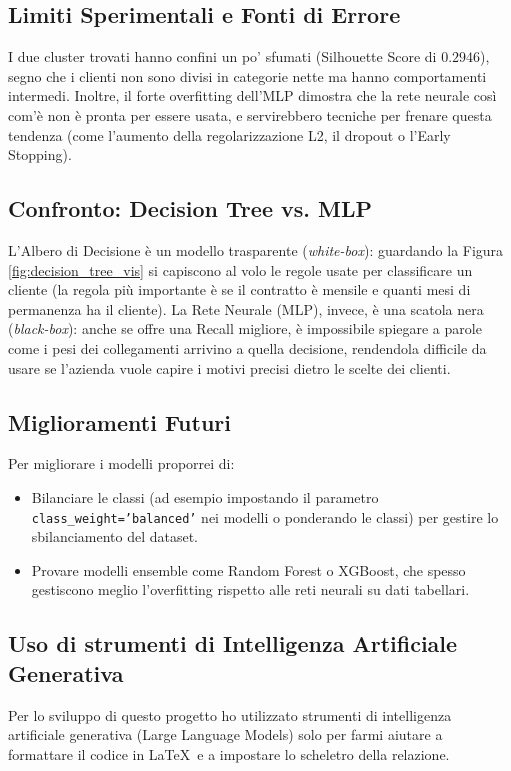 \documentclass[a4paper,11pt]{article}
\begin{document}
\subsection{Limiti Sperimentali e Fonti di Errore}
I due cluster trovati hanno confini un po' sfumati (Silhouette Score di $0.2946$), segno che i clienti non sono divisi in categorie nette ma hanno comportamenti intermedi. Inoltre, il forte overfitting dell'MLP dimostra che la rete neurale così com'è non è pronta per essere usata, e servirebbero tecniche per frenare questa tendenza (come l'aumento della regolarizzazione L2, il dropout o l'Early Stopping).

\subsection{Confronto: Decision Tree vs. MLP}
L'Albero di Decisione è un modello trasparente (\textit{white-box}): guardando la Figura \ref{fig:decision_tree_vis} si capiscono al volo le regole usate per classificare un cliente (la regola più importante è se il contratto è mensile e quanti mesi di permanenza ha il cliente). La Rete Neurale (MLP), invece, è una scatola nera (\textit{black-box}): anche se offre una Recall migliore, è impossibile spiegare a parole come i pesi dei collegamenti arrivino a quella decisione, rendendola difficile da usare se l'azienda vuole capire i motivi precisi dietro le scelte dei clienti.

\subsection{Miglioramenti Futuri}
Per migliorare i modelli proporrei di:
\begin{itemize}
    \item Bilanciare le classi (ad esempio impostando il parametro \texttt{class\_weight='balanced'} nei modelli o ponderando le classi) per gestire lo sbilanciamento del dataset.
    \item Provare modelli ensemble come Random Forest o XGBoost, che spesso gestiscono meglio l'overfitting rispetto alle reti neurali su dati tabellari.
\end{itemize}

\subsection{Uso di strumenti di Intelligenza Artificiale Generativa}
Per lo sviluppo di questo progetto ho utilizzato strumenti di intelligenza artificiale generativa (Large Language Models) solo per farmi aiutare a formattare il codice in \LaTeX\ e a impostare lo scheletro della relazione.
\end{document}
